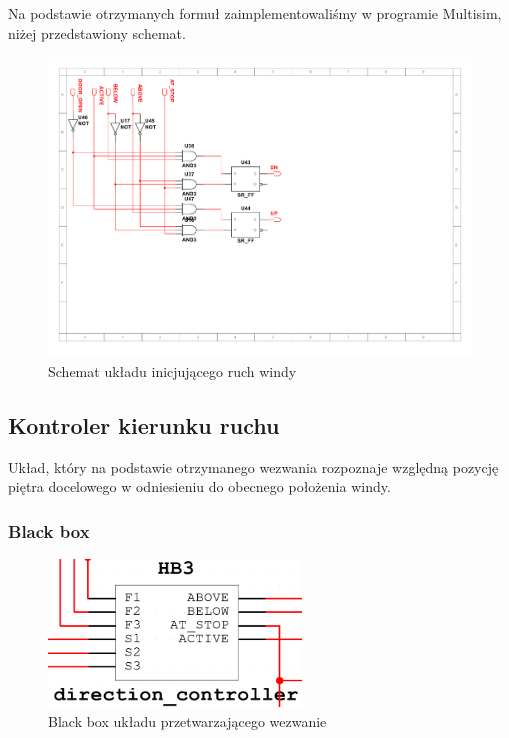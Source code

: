 \documentclass[a4paper]{article}
\begin{document}
Na podstawie otrzymanych formuł zaimplementowaliśmy w programie Multisim,
niżej przedstawiony schemat.

\begin{figure}[H]
    \centering
    \includegraphics[width=\textwidth]{floor_controller_schemat.pdf}
    \caption{Schemat układu inicjującego ruch windy}
\end{figure}

\pagebreak
\subsection{Kontroler kierunku ruchu}

Układ, który na podstawie otrzymanego wezwania rozpoznaje względną pozycję piętra docelowego
w odniesieniu do obecnego położenia windy.

\subsubsection{Black box}
\begin{figure}[H]
    \centering
    \includegraphics[width=0.6\textwidth]{direction_controller.png}
    \caption{Black box układu przetwarzającego wezwanie}
\end{figure}
\end{document}

